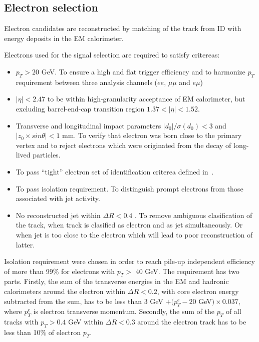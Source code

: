 \subsection{Electron selection}
\label{subsec:electron_selection}

Electron candidates are reconstructed by matching of the track from ID with energy deposits in the EM calorimeter.


Electrons used for the signal selection are required to satisfy critereas:
\begin{itemize}
 \item $p_T > 20$ GeV. To ensure a high and flat trigger efficiency and to harmonize $p_T$ requirement between three analysis channels ($ee$, $\mu\mu$ and $e\mu$) 
 \item $|\eta|<2.47$ to be within high-granularity acceptance of EM calorimeter, but excluding barrel-end-cap transition region $1.37<|\eta|<1.52$.
 \item Transverse and longitudinal impact parameters $|d_0|/\sigma(d_0) < 3$ and $|z_0 \times sin \theta| < 1$ mm. 
 To verify that electron was born close to the primary vertex and to reject electrons which were originated from the decay of long-lived particles.
 \item To pass ``tight'' electron set of identification criterea defined in~\cite{electron_tight}. \\ 
 \item To pass isolation requirement. To distinguish prompt electrons from those associated with jet activity.
 \item No reconstructed jet within $\Delta R < 0.4$ \toFix[define R]. To remove ambiguous clasification of the track, when track is clasified as electron and as jet simultaneously. 
 Or when jet is too close to the electron which will lead to poor reconstruction of latter. 
\end{itemize}

Isolation requirement were chosen in order to reach pile-up independent efficiency of more than 99$\%$ for electrons 
with $p_T >$ 40 GeV. The requirement has two parts.
Firstly, the sum of the transverse energies in the EM and hadronic calorimeters around the electron within 
$\Delta R < 0.2$, with core electron energy subtracted from the sum, has to be less than 
3 GeV $+ (p_T^e - 20$ GeV$) \times 0.037$, where $p_T^e$ is electron transverse momentum.
Secondly, the sum of the $p_T$ of all tracks with $p_T > 0.4$ GeV within $\Delta R < 0.3$ around the electron track has
to be less than 10$\%$ of electron $p_T$.

